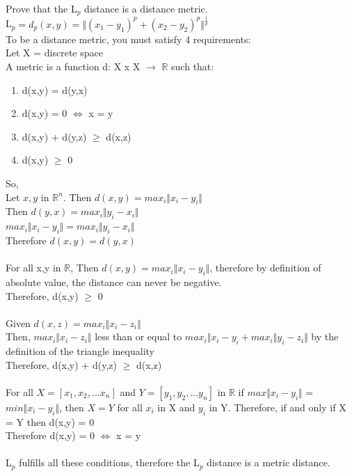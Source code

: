 \documentclass[10pt,letterpaper]{article}
\newcommand{\R}{\mathbb{R}}
\begin{document}
Prove that the L$_{p}$ distance is a distance metric.\\
L$_{p} = d_{p}(x,y) = \Vert(x_{1} - y_{1})^{p} + (x_{2} - y_{2})^{p} \Vert^{\frac{1}{p}}$ \\
To be a distance metric, you must satisfy 4 requirements:\\
Let X = discrete space\\
A metric is a function d: X x X $\rightarrow$ $\R$ such that:
\begin{enumerate}
  \item d(x,y) = d(y,x)
  \item d(x,y) = 0 $\Leftrightarrow$ x = y
  \item d(x,y) + d(y,z) $\geq$ d(x,z)
  \item d(x,y) $\geq$ 0
\end{enumerate}
So,\\
Let $x,y$ in $\R^{n}$. Then $d(x,y) = max_{i} \Vert x_{i} - y_{i} \Vert$\\
Then $d(y,x) = max_{i} \Vert y_{i} - x_{i} \Vert$\\
$max_{i} \Vert x_{i} - y_{i} \Vert = max_{i} \Vert y_{i} - x_{i} \Vert$\\
Therefore $d(x,y) = d(y,x)$\\
\\
For all x,y in $\R$, Then $d(x,y) = max_{i} \Vert x_{i} - y_{i} \Vert$, therefore by definition of absolute value, the distance can never be negative.\\
Therefore, d(x,y) $\geq$ 0\\
\\
Given $d(x,z) = max_{i} \Vert x_{i} - z_{i} \Vert$\\ 
Then, $max_{i} \Vert x_{i} - z_{i} \Vert$ less than or equal to $max_{i} \Vert x_{i} - y_{i} + max_{i} \Vert y_{i} - z_{i} \Vert$ by the definition of the triangle inequality\\
Therefore, d(x,y) + d(y,z) $\geq$ d(x,z)\\
\\
For all $X = [x_{1}, x_{2}, ... x_{n}]$ and $Y = [y_{1}, y_{2}, ... y_{n}]$ in $\R$ if $max \Vert x_{i} - y_{i} \Vert$ = $min \Vert x_{i} - y_{i} \Vert$, then $X = Y$ for all $x_{i}$ in X and $y_{i}$ in Y. Therefore, if and only if X = Y then d(x,y) = 0\\
Therefore d(x,y) = 0 $\Leftrightarrow$ x = y\\
\\
L$_{p}$ fulfills all these conditions, therefore the L$_{p}$ distance is a metric distance.
\end{document}
